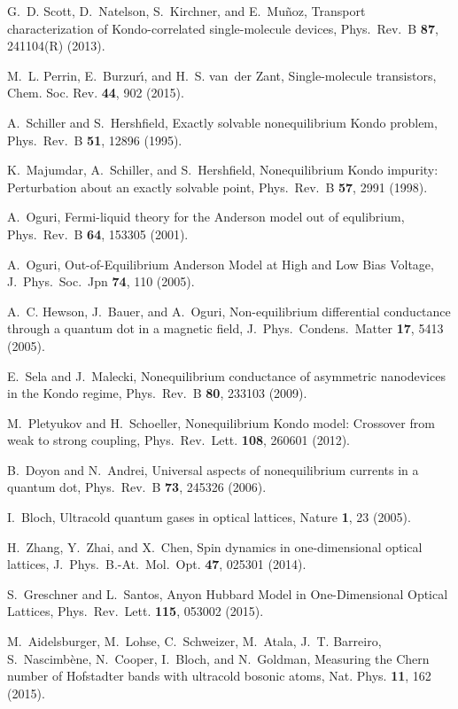 \documentclass[aps,twocolumn,showpacs,floatfix,prl]{revtex4}
\begin{document}
\begin{thebibliography}{10}
G.~D. Scott, D.~Natelson, S.~Kirchner, and E.~{Mu\~noz}, Transport
  characterization of Kondo-correlated single-molecule devices, Phys.~Rev.~B
  {\bf 87}, 241104(R) (2013).

M.~L. Perrin, E.~Burzur{\'\i}, and H.~S. van~der Zant, Single-molecule
  transistors, Chem. Soc. Rev. {\bf 44}, 902 (2015).

A.~Schiller and S.~Hershfield, Exactly solvable nonequilibrium Kondo problem,
  Phys.~Rev.~B {\bf 51}, 12896 (1995).

K.~Majumdar, A.~Schiller, and S.~Hershfield, Nonequilibrium Kondo impurity:
  Perturbation about an exactly solvable point, Phys.~Rev.~B {\bf 57},
  2991 (1998).

A.~Oguri, Fermi-liquid theory for the Anderson model out of equlibrium,
  Phys.~Rev.~B {\bf 64}, 153305 (2001).

A.~Oguri, Out-of-Equilibrium Anderson Model at High and Low Bias Voltage,
  J.~Phys.~Soc.~Jpn {\bf 74}, 110 (2005).

A.~C. Hewson, J.~Bauer, and A.~Oguri, Non-equilibrium differential conductance
  through a quantum dot in a magnetic field, J.~Phys.~Condens.~Matter {\bf 17},
  5413 (2005).

E.~Sela and J.~Malecki, Nonequilibrium conductance of asymmetric nanodevices in
  the Kondo regime, Phys.~Rev.~B {\bf 80}, 233103 (2009).

M.~Pletyukov and H.~Schoeller, Nonequilibrium {K}ondo model: Crossover from
  weak to strong coupling, Phys.~Rev.~Lett. {\bf 108}, 260601 (2012).

B.~Doyon and N.~Andrei, Universal aspects of nonequilibrium currents in a
  quantum dot, Phys.~Rev.~B {\bf 73}, 245326 (2006).

I.~Bloch, Ultracold quantum gases in optical lattices, Nature {\bf 1},
  23 (2005).

H.~Zhang, Y.~Zhai, and X.~Chen, Spin dynamics in one-dimensional optical
  lattices, J.~Phys.~B.-At.~Mol.~Opt. {\bf 47}, 025301 (2014).

S.~Greschner and L.~Santos, Anyon Hubbard Model in One-Dimensional Optical
  Lattices, Phys.~Rev.~Lett. {\bf 115}, 053002 (2015).

M.~Aidelsburger, M.~Lohse, C.~Schweizer, M.~Atala, J.~T. Barreiro,
  S.~Nascimb{\`e}ne, N.~Cooper, I.~Bloch, and N.~Goldman, Measuring the Chern
  number of Hofstadter bands with ultracold bosonic atoms, Nat. Phys. {\bf 11},
  162 (2015).


\end{thebibliography}
\end{document}
